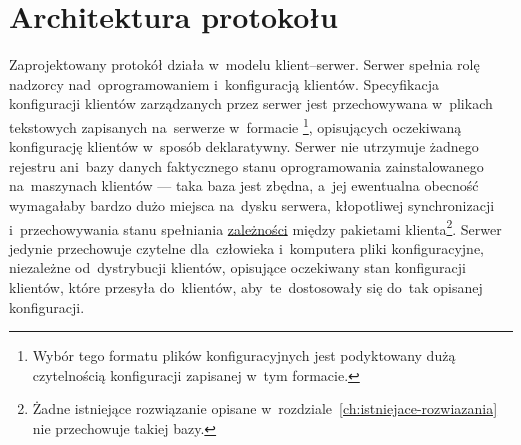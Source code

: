 \documentclass[thesis]{subfiles}
\begin{document}


\section{Architektura protokołu}

Zaprojektowany protokół działa w~modelu klient--serwer. Serwer spełnia rolę nadzorcy nad~oprogramowaniem i~konfiguracją klientów. Specyfikacja konfiguracji klientów zarządzanych przez serwer jest przechowywana w~plikach tekstowych zapisanych na~serwerze w~formacie \footnote{Wybór tego formatu plików konfiguracyjnych jest podyktowany dużą czytelnością konfiguracji zapisanej w~tym formacie.}, opisujących oczekiwaną konfigurację klientów w~sposób deklaratywny. Serwer nie utrzymuje żadnego rejestru ani~bazy danych faktycznego stanu oprogramowania zainstalowanego na~maszynach klientów --- taka baza jest zbędna, a~jej ewentualna obecność wymagałaby bardzo dużo miejsca na~dysku serwera, kłopotliwej synchronizacji i~przechowywania stanu spełniania \href{https://en.wikipedia.org/wiki/Dependency_hell}{zależności} między pakietami klienta\footnote{Żadne istniejące rozwiązanie opisane w~rozdziale~\ref{ch:istniejace-rozwiazania} nie przechowuje takiej bazy.}. Serwer jedynie przechowuje czytelne dla~człowieka i~komputera pliki konfiguracyjne, niezależne od~dystrybucji  klientów, opisujące oczekiwany stan konfiguracji klientów, które przesyła do~klientów, aby~te~dostosowały się do~tak opisanej konfiguracji.
\end{document}
